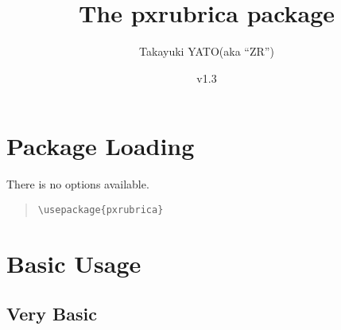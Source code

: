 \documentclass[a4paper]{article}
\newcommand*{\PKN}[1]{\textsf{#1}}
\newcommand*{\myfileversion}{1.3}
\newcommand*{\myfiledate}{2017/04/27}
\begin{document}
\title{The \PKN{pxrubrica} package}
\author{Takayuki YATO\quad (aka ``ZR'')}
\date{v\myfileversion \quad[\myfiledate]}
\maketitle


\section{Package Loading}

There is no options available.

\begin{quote}\small\begin{verbatim}
\usepackage{pxrubrica}
\end{verbatim}\end{quote}

\section{Basic Usage}

\subsection{Very Basic}
\end{document}
